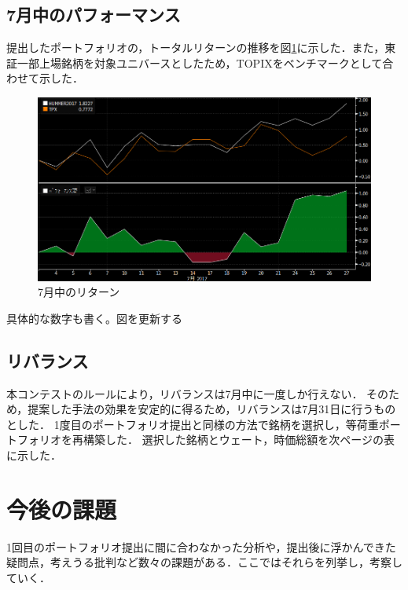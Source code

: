 ﻿\documentclass[11pt]{jreport}
\begin{document}
\section{7月中のパフォーマンス}

提出したポートフォリオの，トータルリターンの推移を図\ref{fig:totalreturn}に示した．また，東証一部上場銘柄を対象ユニバースとしたため，TOPIXをベンチマークとして合わせて示した．

\begin{figure}[htbp]
	\begin{center}
		\includegraphics[width=15cm]{./fig/totalreturn.png}
		\caption{7月中のリターン}
		\label{fig:totalreturn}
	\end{center}
\end{figure}
具体的な数字も書く。図を更新する


\section{リバランス}
本コンテストのルールにより，リバランスは7月中に一度しか行えない．
そのため，提案した手法の効果を安定的に得るため，リバランスは7月31日に行うものとした．
1度目のポートフォリオ提出と同様の方法で銘柄を選択し，等荷重ポートフォリオを再構築した．
選択した銘柄とウェート，時価総額を次ページの表に示した．
\chapter{今後の課題}
1回目のポートフォリオ提出に間に合わなかった分析や，提出後に浮かんできた疑問点，考えうる批判など数々の課題がある．ここではそれらを列挙し，考察していく．
\end{document}
